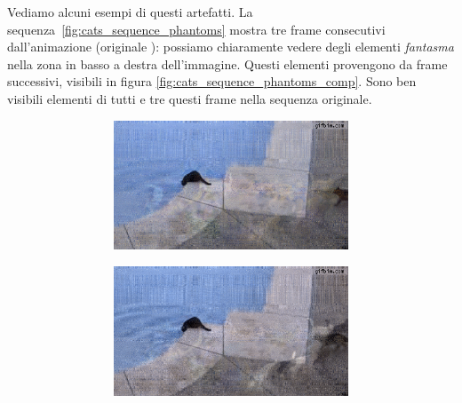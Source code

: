 \documentclass[11pt,a4paper]{article}
\begin{document}
Vediamo alcuni esempi di questi artefatti. La sequenza~\ref{fig:cats_sequence_phantoms} mostra tre frame consecutivi dall'animazione \href{http://poisson.phc.unipi.it/~bianucci/shared/tesi/cats_TT.gif}{} (originale \href{http://poisson.phc.unipi.it/~bianucci/shared/tesi/cats.gif}{}): possiamo chiaramente vedere degli elementi \emph{fantasma} nella zona in basso a destra dell'immagine. Questi elementi provengono da frame successivi, visibili in figura \ref{fig:cats_sequence_phantoms_comp}. Sono ben visibili elementi di tutti e tre questi frame nella sequenza originale.

\begin{figure}
  \captionsetup[subfigure]{justification=centering}
  \centering
  \def\wid{0.48}
  \def\scal{0.44}
  \begin{subfigure}[]{\wid\textwidth}
    \begin{subfigure}[]{\wid\textwidth}
      \centering
      \includegraphics[keepaspectratio=true, scale=\scal]{Imgs/Cats/frame-10}
    \end{subfigure}
    
    \begin{subfigure}[]{\wid\textwidth}
      \centering
      \includegraphics[keepaspectratio=true, scale=\scal]{Imgs/Cats/frame-11}
    \end{subfigure}
    

\end{subfigure}
\end{figure}
\end{document}

